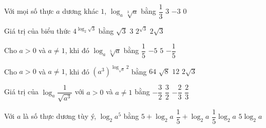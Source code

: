 \begin{ex}%
	Với mọi số thực  $a$ dương khác $1$, $\log_{a}\sqrt[3]{a}$ bằng
	 \choice
		{\True $\dfrac{1}{3}$} 
		{$3$} 
		 {$-3$}
		{$0$} 
\end{ex}

\begin{ex}%
	Giá trị của biểu  thức $4^{\log_{2}\sqrt{3}}$ bằng
	\choice 
		{$\sqrt{3}$} 
		 {\True $3$}
		 {$2^{\sqrt{3}}$}
		{$2\sqrt{3}$} 
\end{ex}

\begin{ex}%
	Cho $a>0$ và $a\ne1$, khi  đó $\log_{a}\sqrt[5]{a}$ bằng
	 \choice
		 {\True $\dfrac{1}{5}$}
		 {$-5$}
		{$5$} 
		 {$-\dfrac{1}{5}$}
\end{ex}

\begin{ex}%
	Cho $a>0$ và $a\ne1$, khi đó $\left(a^{3}\right)^{\log_{\sqrt{a}}2}$ bằng 
	\choice 
		 {\True $64$}
		 {$\sqrt{8}$}
		 {$12$}
		{$2\sqrt{3}$} 
\end{ex}

\begin{ex}%
	Giá trị của $\log_{a}\dfrac{1}{\sqrt{a^{3}}}$ với $a > 0$ và $a  \ne 1$ bằng
	 \choice
		 {\True $-\dfrac{3}{2}$}
		 {$\dfrac{3}{2}$}
		 {$-\dfrac{2}{3}$}
		 {$\dfrac{2}{3}$}
\end{ex}

\begin{ex}%
	Với $a$ là số  thực dương tùy ý, $\log_2a^5$ bằng
	\choice 
		{$5+\log_2a$} 
		{$\dfrac{1}{5}+\log_2a$} 
		 {$\dfrac{1}{5}{\log_2}a$}
		 {\True $5\log_2a$}
\end{ex}

